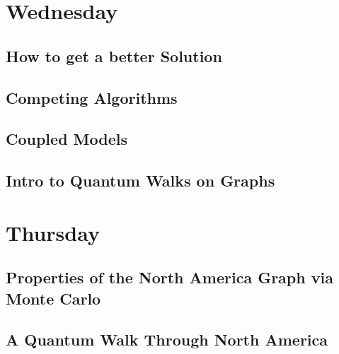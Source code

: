 \documentclass{article}
\theoremstyle{definition}
\theoremstyle{remark}
\begin{document}
\section{Wednesday}
\subsection{How to get a better Solution}
\subsection{Competing Algorithms}
\subsection{Coupled Models}
\subsection{Intro to Quantum Walks on Graphs}

\section{Thursday}
\subsection{Properties of the North America Graph via Monte Carlo}
\subsection{A Quantum Walk Through North America}
\end{document}
